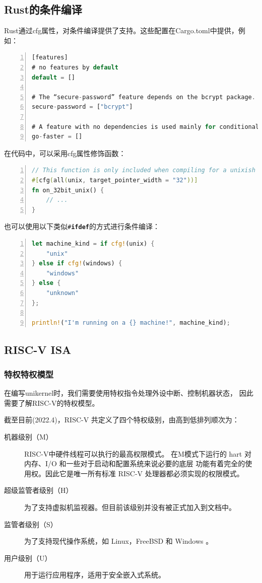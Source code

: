 \documentclass{../runikraft-report}
\begin{document}
\subsection{Rust的条件编译}\label{subsec:cond-compile}
Rust通过cfg属性，对条件编译提供了支持。这些配置在Cargo.toml中提供，例如：

\begin{lstlisting}[numbers=left,language=Rust]
[features]
# no features by default
default = []

# The “secure-password” feature depends on the bcrypt package.
secure-password = ["bcrypt"]

# A feature with no dependencies is used mainly for conditional compilation, like `#[cfg(feature = "go-faster")]`.
go-faster = []
\end{lstlisting}

在代码中，可以采用cfg属性修饰函数：
\begin{lstlisting}[numbers=left,language=Rust]
// This function is only included when compiling for a unixish OS with a 32-bit architecture
#[cfg(all(unix, target_pointer_width = "32"))]
fn on_32bit_unix() {
	// ...
}
\end{lstlisting}
也可以使用以下类似\texttt{\#\textbf{ifdef}}的方式进行条件编译：
\begin{lstlisting}[numbers=left,language=Rust]
let machine_kind = if cfg!(unix) {
	"unix"
} else if cfg!(windows) {
	"windows"
} else {
	"unknown"
};

println!("I'm running on a {} machine!", machine_kind);
\end{lstlisting}
\cite{bib:feasibility-e}

\subsection{RISC-V ISA}\vspace*{-4ex}
\subsubsection{特权特权模型}
在编写unikernel时，我们需要使用特权指令处理外设中断、控制机器状态，
因此需要了解RISC-V的特权模型。

截至目前(2022.4)，RISC-V 共定义了四个特权级别，由高到低排列顺次为：

\begin{description}
\item[机器级别（M）] RISC-V中硬件线程可以执行的最高权限模式。
在M模式下运行的 hart 对内存、I/O 和一些对于启动和配置系统来说必要的底层
功能有着完全的使用权。因此它是唯一所有标准 RISC-V 处理器都必须实现的权限模式。\cite{bib:feasibility-a}
\item[超级监管者级别（H）] 为了支持虚拟机监视器。但目前该级别并没有被正式加入到文档中。
\item[监管者级别（S）] 为了支持现代操作系统，如 Linux，FreeBSD 和 Windows 。
\item[用户级别（U）] 用于运行应用程序，适用于安全嵌入式系统。
\end{description}
\end{document}
